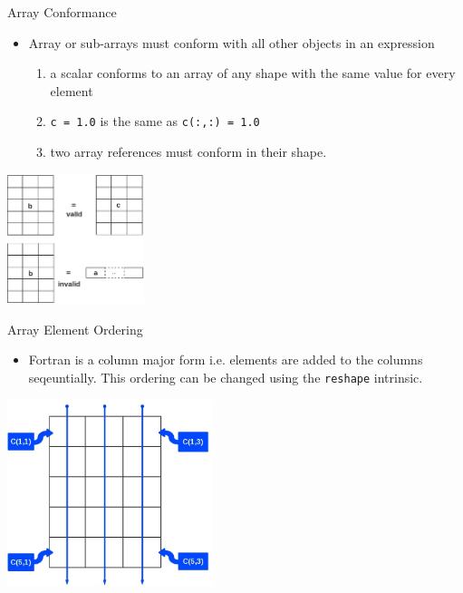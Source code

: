 \documentclass[c,mathserif,compress,xcolor=svgnames]{beamer}
\newcommand{\lstfortran}[1]{\lstinline[language={[90]Fortran},basicstyle=\footnotesize\ttfamily]|#1|}
\begin{document}
\begin{frame}{Array Conformance}
  \begin{itemize}
    \item Array or sub-arrays must conform with all other objects in an expression
      \begin{enumerate}
        \item a scalar conforms to an array of any shape with the same value for every element
        \item[] \lstfortran{c = 1.0} is the same as \lstfortran{c(:,:) = 1.0}
        \item two array references must conform in their shape.
      \end{enumerate}
  \end{itemize}
  \begin{center}
    \includegraphics[width=4cm]{./array4}
  \end{center}
\end{frame}

\begin{frame}{Array Element Ordering}
  \begin{itemize}
    \item Fortran is a column major form i.e. elements are added to the columns seqeuntially. This ordering can be changed using the \lstfortran{reshape} intrinsic.
  \end{itemize}
  \begin{center}
    \includegraphics[width=6cm,clip=true]{./array5}
  \end{center}
\end{frame}
\end{document}
